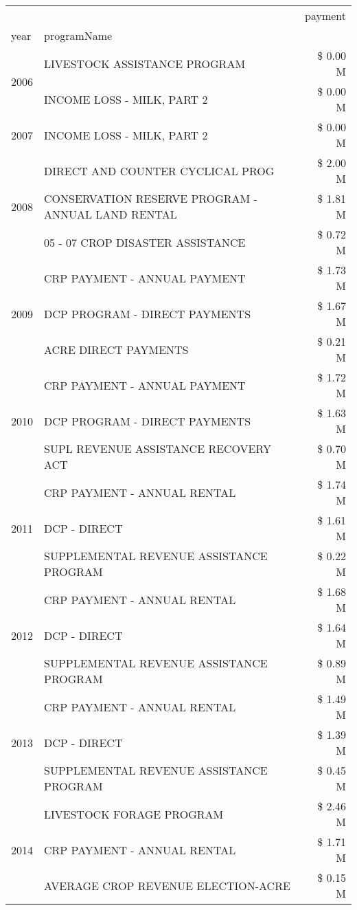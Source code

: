 \begin{tabular}{llr}
\toprule
 &  & payment \\
year & programName &  \\
\midrule
\multirow[t]{2}{*}{2006} & LIVESTOCK ASSISTANCE PROGRAM & \$ 0.00 M \\
 & INCOME LOSS - MILK, PART 2 & \$ 0.00 M \\
\cline{1-3}
2007 & INCOME LOSS - MILK, PART 2 & \$ 0.00 M \\
\cline{1-3}
\multirow[t]{3}{*}{2008} & DIRECT AND COUNTER CYCLICAL PROG & \$ 2.00 M \\
 & CONSERVATION RESERVE PROGRAM - ANNUAL LAND RENTAL & \$ 1.81 M \\
 & 05 - 07 CROP DISASTER ASSISTANCE & \$ 0.72 M \\
\cline{1-3}
\multirow[t]{3}{*}{2009} & CRP PAYMENT - ANNUAL PAYMENT & \$ 1.73 M \\
 & DCP PROGRAM - DIRECT PAYMENTS & \$ 1.67 M \\
 & ACRE DIRECT PAYMENTS & \$ 0.21 M \\
\cline{1-3}
\multirow[t]{3}{*}{2010} & CRP PAYMENT - ANNUAL PAYMENT & \$ 1.72 M \\
 & DCP PROGRAM - DIRECT PAYMENTS & \$ 1.63 M \\
 & SUPL REVENUE ASSISTANCE RECOVERY ACT & \$ 0.70 M \\
\cline{1-3}
\multirow[t]{3}{*}{2011} & CRP PAYMENT - ANNUAL RENTAL & \$ 1.74 M \\
 & DCP - DIRECT & \$ 1.61 M \\
 & SUPPLEMENTAL REVENUE ASSISTANCE PROGRAM & \$ 0.22 M \\
\cline{1-3}
\multirow[t]{3}{*}{2012} & CRP PAYMENT - ANNUAL RENTAL & \$ 1.68 M \\
 & DCP - DIRECT & \$ 1.64 M \\
 & SUPPLEMENTAL REVENUE ASSISTANCE PROGRAM & \$ 0.89 M \\
\cline{1-3}
\multirow[t]{3}{*}{2013} & CRP PAYMENT - ANNUAL RENTAL & \$ 1.49 M \\
 & DCP - DIRECT & \$ 1.39 M \\
 & SUPPLEMENTAL REVENUE ASSISTANCE PROGRAM & \$ 0.45 M \\
\cline{1-3}
\multirow[t]{3}{*}{2014} & LIVESTOCK FORAGE PROGRAM & \$ 2.46 M \\
 & CRP PAYMENT - ANNUAL RENTAL & \$ 1.71 M \\
 & AVERAGE CROP REVENUE ELECTION-ACRE & \$ 0.15 M \\
\cline{1-3}

\end{tabular}

